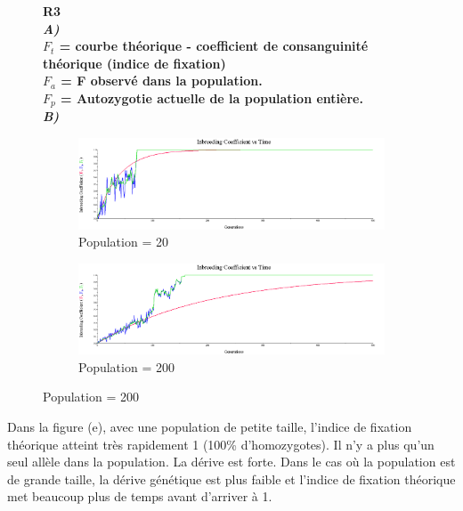 \documentclass[a4paper]{report}
\renewcommand{\textbf}[1]{\begingroup\bfseries\mathversion{bold}#1\endgroup}
\begin{document}
\begin{figure}[!h]
\textbf{R3}\\
\textit{A)}\\
$F_t$ = courbe théorique - coefficient de consanguinité théorique (indice de fixation)\\
$F_a$ = F observé dans la population. \\
$F_p$ = Autozygotie actuelle de la population entière.\\

\textit{B)}\\
	\begin{subfigure}{.5\textwidth}
	\centering
	\includegraphics[width=.99\linewidth]{r3_3.png}
	\caption{Population = 20}
\end{subfigure}%
\begin{subfigure}{.5\textwidth}
	\centering
	\includegraphics[width=.99\linewidth]{r3_4.png}
	\caption{Population = 200}
\end{subfigure}

\end{figure}
Dans la figure (e), avec une population de petite taille, l'indice de fixation théorique atteint très rapidement 1 (100\% d'homozygotes). Il n'y a plus qu'un seul allèle dans la population. La dérive est forte. Dans le cas où la population est de grande taille, la dérive génétique est plus faible et l'indice de fixation théorique met beaucoup plus de temps avant d'arriver à 1. 
\end{document}
